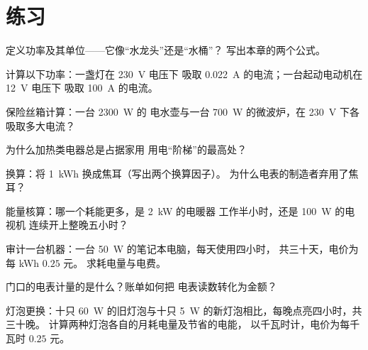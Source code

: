 \section{练习}

\begin{exercise}[$\star$]\label{exo:g9:electric-power-energy:1}
定义功率及其单位——它像“水龙头”还是“水桶”？
写出本章的两个公式。
\end{exercise}

\begin{exercise}[$\star$]\label{exo:g9:electric-power-energy:2}
计算以下功率：一盏灯在 \qty{230}{V} 电压下
吸取 \qty{0.022}{A} 的电流；一台起动电动机在 \qty{12}{V} 电压下
吸取 \qty{100}{A} 的电流。
\end{exercise}

\begin{exercise}[$\star$]\label{exo:g9:electric-power-energy:3}
保险丝箱计算：一台 \qty{2300}{W} 的
电水壶与一台 \qty{700}{W} 的微波炉，在 \qty{230}{V} 下各吸取多大电流？
\end{exercise}

\begin{exercise}[$\star$]\label{exo:g9:electric-power-energy:4}
为什么加热类电器总是占据家用
用电“阶梯”的最高处？
\end{exercise}

\begin{exercise}[$\star$]\label{exo:g9:electric-power-energy:5}
换算：将 \qty{1}{kWh} 换成焦耳（写出两个换算因子）。
为什么电表的制造者弃用了焦耳？
\end{exercise}

\begin{exercise}[$\star$]\label{exo:g9:electric-power-energy:6}
能量核算：哪一个耗能更多，是 \qty{2}{kW} 的电暖器
工作半小时，还是 \qty{100}{W} 的电视机
连续开上整晚五小时？
\end{exercise}

\begin{exercise}[$\star$]\label{exo:g9:electric-power-energy:7}
审计一台机器：一台 \qty{50}{W} 的笔记本电脑，每天使用四小时，
共三十天，电价为每 \unit{kWh} $0.25$ 元。
求耗电量与电费。
\end{exercise}

\begin{exercise}[$\star$]\label{exo:g9:electric-power-energy:8}
门口的电表计量的是什么？账单如何把
电表读数转化为金额？
\end{exercise}

\begin{exercise}[$\star\star$]\label{exo:g9:electric-power-energy:9}
灯泡更换：十只 \qty{60}{W} 的旧灯泡与十只
\qty{5}{W} 的新灯泡相比，每晚点亮四小时，共三十晚。
计算两种灯泡各自的月耗电量及节省的电能，
以千瓦时计，电价为每千瓦时 $0.25$ 元。
\end{exercise}


